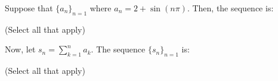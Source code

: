 \documentclass{ximera}
\author{Jim Talamo}
\begin{document}
\begin{exercise}
Suppose that $\{a_n \}_{n=1}$ where $a_n = 2+ \sin(n\pi)$.  Then, the sequence is:

\begin{selectAll}
\end{selectAll}
(Select all that apply)

Now, let $s_n = \sum_{k=1}^{n} a_k$.  The sequence $\{s_n \}_{n=1}$ is:
\begin{selectAll}
\end{selectAll}
(Select all that apply)

\end{exercise}
\end{document}
